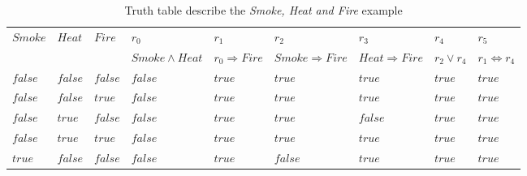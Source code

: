 \begin{sidewaystable}
    \centering
    \caption{Truth table describe the \emph{Smoke, Heat and Fire} example}
    \label{tab:smoketable}
    \begin{tabular}{l|l|l||l|l|l|l|l|l}
    \hline
    \multirow{2}{*}{\textbf{$Smoke$}} & \multirow{2}{*}{\textbf{$Heat$}} & \multirow{2}{*}{\textbf{$Fire$}} & \textbf{$r_{0}$}             & \textbf{$r_{1}$}                  & \textbf{$r_{2}$}                  & \textbf{$r_{3}$}                 & \textbf{$r_{4}$}            & \textbf{$r_{5}$}                       \\ \cline{4-9}
                                      &                                  &                                  & \textbf{$Smoke \wedge Heat$} & \textbf{$r_{0} \Rightarrow Fire$} & \textbf{$Smoke \Rightarrow Fire$} & \textbf{$Heat \Rightarrow Fire$} & \textbf{$r_{2} \vee r_{4}$} & \textbf{$r_{1} \Leftrightarrow r_{4}$} \\ \hline
    $false$                           & $false$                          & $false$                          & $false$                      & $true$                            & $true$                            & $true$                           & $true$                      & $true$                                 \\
    $false$                           & $false$                          & $true$                           & $false$                      & $true$                            & $true$                            & $true$                           & $true$                      & $true$                                 \\
    $false$                           & $true$                           & $false$                          & $false$                      & $true$                            & $true$                            & $false$                          & $true$                      & $true$                                 \\
    $false$                           & $true$                           & $true$                           & $false$                      & $true$                            & $true$                            & $true$                           & $true$                      & $true$                                 \\
    \underline{$true$}                & $false$                          & $false$                          & $false$                      & $true$                            & $false$                           & $true$                           & $true$                      & $true$                                 \\

\end{tabular}
\end{sidewaystable}
